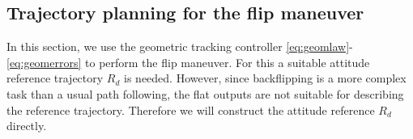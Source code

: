 \subsection{Trajectory planning for the flip maneuver}
In this section, we use the geometric tracking controller \eqref{eq:geomlaw}-\eqref{eq:geomerrors} to perform the flip maneuver. For this a suitable attitude reference trajectory $R_d$ is needed. However, since backflipping is a more complex task than a usual path following, the flat outputs are not suitable for describing the reference trajectory. Therefore we will construct the attitude reference $R_d$ directly. 

